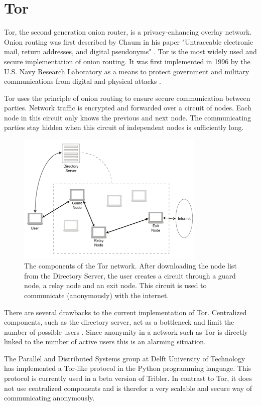 \section{Tor}
	Tor, the second generation onion router, is a privacy-enhancing overlay network. Onion routing was first described by Chaum in his paper "Untraceable electronic mail, return addresses, and digital pseudonyms" \cite{chaum1981untraceable}. Tor is the most widely used and secure implementation of onion routing. It was first implemented in 1996 by the U.S. Navy Research Laboratory as a means to protect government and military communications from digital and physical attacks \cite{goldschlag1996hiding}.
	
	Tor uses the principle of onion routing to ensure secure communication between parties. Network traffic is encrypted and forwarded over a circuit of nodes. Each node in this circuit only knows the previous and next node. The communicating parties stay hidden when this circuit of independent nodes is sufficiently long.
	
	\begin{figure}[!t]
		\centering
		\includegraphics[width=0.8\textwidth]{prior-work/tor.pdf}
		\caption{The components of the Tor network. After downloading the node list from the Directory Server, the user creates a circuit through a guard node, a relay node and an exit node. This circuit is used to communicate (anonymously) with the internet.}
		\label{fig:tor_layout}
	\end{figure}
	
	There are several drawbacks to the current implementation of Tor. Centralized components, such as the directory server, act as a bottleneck and limit the number of possible users \cite{jagerman2014fifteen}. Since anonymity in a network such as Tor is directly linked to the number of active users this is an alarming situation.
	
	The Parallel and Distributed Systems group at Delft University of Technology has implemented a Tor-like protocol in the Python programming language. This protocol is currently used in a beta version of Tribler. In contrast to Tor, it does not use centralized components and is therefor a very scalable and secure way of communicating anonymously.
